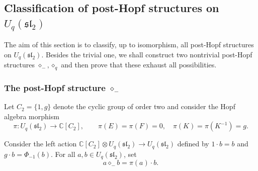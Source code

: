 \documentclass[11pt,english]{article}
\newcommand{\act}{\mathbin{\diamond}}
\theoremstyle{definition}
\begin{document}
\subsection{Classification of post-Hopf structures on $U_q(\mathfrak{sl}_2)$}\label{subsec:class}

The aim of this section is to classify, up to isomorphism, all post-Hopf structures on
$U_q(\mathfrak{sl}_2)$. Besides the trivial one, we shall construct two nontrivial post-Hopf structures $\act_-, \act_q$ and
then prove that these exhaust all possibilities.

\subsubsection{The post-Hopf structure $\act_{-}$}

Let $C_2=\{1,g\}$ denote the cyclic group of order two and consider the
Hopf algebra morphism
\begin{equation}\label{eq:quotient}
\pi:U_q(\mathfrak{sl}_2)\longrightarrow\mathbb{C}[C_2],\qquad
\pi(E)=\pi(F)=0,\quad \pi(K)=\pi(K^{-1})=g.
\end{equation}

Consider the left action $\mathbb{C}[C_2]\otimes U_q(\mathfrak{sl}_2)
\to U_q(\mathfrak{sl}_2)$ defined by
$1\cdot b=b$ and $g\cdot b=\Phi_{-1}(b)$.
For all $a,b\in U_q(\mathfrak{sl}_2)$, set
\begin{equation}\label{eq:sign}
a\act_- b=\pi(a)\cdot b.
\end{equation}
\end{document}
